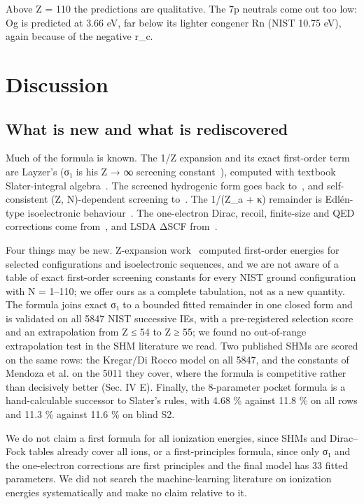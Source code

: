 \documentclass[aps,pra,preprint,superscriptaddress,amsmath,amssymb]{revtex4-2}
\begin{document}
Above Z = 110 the predictions are qualitative. The 7p neutrals come out too low: Og is predicted at 3.66 eV, far below its lighter congener Rn (NIST 10.75 eV), again because of the negative r\_c.


\section{Discussion}

\subsection{What is new and what is rediscovered}

Much of the formula is known. The 1/Z expansion and its exact first-order term are Layzer's (σ₁ is his Z → ∞ screening constant~\cite{r4}), computed with textbook Slater-integral algebra~\cite{r33,r34}. The screened hydrogenic form goes back to~\cite{r1,r10,r11}, and self-consistent (Z, N)-dependent screening to~\cite{r17,r20}. The 1/(Z\_a + κ) remainder is Edlén-type isoelectronic behaviour~\cite{r8}. The one-electron Dirac, recoil, finite-size and QED corrections come from~\cite{r31,r32}, and LSDA ΔSCF from~\cite{r27,r28}.


Four things may be new. Z-expansion work~\cite{r4,r5,r9} computed first-order energies for selected configurations and isoelectronic sequences, and we are not aware of a table of exact first-order screening constants for every NIST ground configuration with N = 1–110; we offer ours as a complete tabulation, not as a new quantity. The formula joins exact σ₁ to a bounded fitted remainder in one closed form and is validated on all 5847 NIST successive IEs, with a pre-registered selection score and an extrapolation from Z ≤ 54 to Z ≥ 55; we found no out-of-range extrapolation test in the SHM literature we read. Two published SHMs are scored on the same rows: the Kregar/Di Rocco model on all 5847, and the constants of Mendoza et al. on the 5011 they cover, where the formula is competitive rather than decisively better (Sec. IV E). Finally, the 8-parameter pocket formula is a hand-calculable successor to Slater's rules, with 4.68 \% against 11.8 \% on all rows and 11.3 \% against 11.6 \% on blind S2.


We do not claim a first formula for all ionization energies, since SHMs and Dirac–Fock tables already cover all ions, or a first-principles formula, since only σ₁ and the one-electron corrections are first principles and the final model has 33 fitted parameters. We did not search the machine-learning literature on ionization energies systematically and make no claim relative to it.
\end{document}
